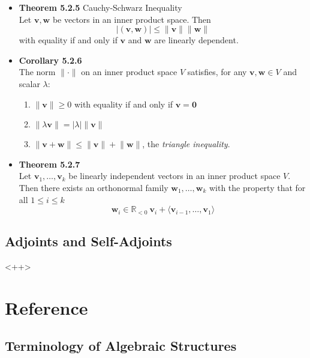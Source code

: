 \documentclass[11pt,a4paper]{article}
\begin{document}
\begin{itemize}
    \item \textbf{Theorem 5.2.5} Cauchy-Schwarz Inequality \\
        Let $\mathbf{v}, \mathbf{w}$ be vectors in an inner product space. Then
        \[
            |(\mathbf{v}, \mathbf{w})| \leq \lVert \mathbf{v} \rVert \lVert \mathbf{w} \rVert
        \]
        with equality if and only if $\mathbf{v}$ and $\mathbf{w}$ are linearly dependent.

    \item \textbf{Corollary 5.2.6} \\
        The norm $\lVert \cdot \rVert$ on an inner product space $V$ satisfies,
        for any $\mathbf{v}, \mathbf{w} \in V$ and scalar $\lambda$:
        \begin{enumerate}
            \item $\lVert \mathbf{v} \rVert \geq 0$ with equality if and only if
                $\mathbf{v} = \mathbf{0}$
            \item $\lVert \lambda \mathbf{v} \rVert = |\lambda| \lVert \mathbf{v} \rVert$
            \item $\lVert \mathbf{v} + \mathbf{w} \rVert \leq
                \lVert \mathbf{v} \rVert + \lVert \mathbf{w} \rVert$,
                the \emph{triangle inequality}.
        \end{enumerate}

    \item \textbf{Theorem 5.2.7} \\
        Let $\mathbf{v}_1, \ldots, \mathbf{v}_k$ be linearly independent vectors in an
        inner product space $V$.
        Then there exists an orthonormal family $\mathbf{w}_1, \ldots, \mathbf{w}_k$
        with the property that for all $1 \leq i \leq k$
        \[
            \mathbf{w}_i \in \mathbb{R}_{<0} \ \mathbf{v}_i +
            \langle \mathbf{v}_{i-1}, \ldots, \mathbf{v}_1 \rangle
        \]

\end{itemize}

\subsection{Adjoints and Self-Adjoints}
<++>

\section{Reference}

\subsection{Terminology of Algebraic Structures}
\end{document}
